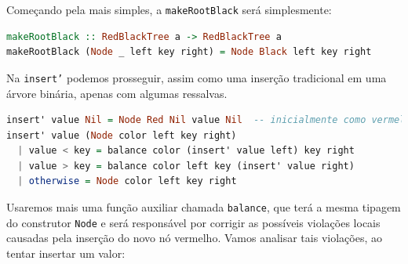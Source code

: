 Começando pela mais simples, a \texttt{makeRootBlack} será simplesmente:

\begin{lstlisting}[language=haskell]
makeRootBlack :: RedBlackTree a -> RedBlackTree a
makeRootBlack (Node _ left key right) = Node Black left key right
\end{lstlisting}
\FloatBarrier

Na \texttt{insert'} podemos prosseguir, assim como uma inserção tradicional em uma árvore binária, apenas com algumas ressalvas.

\begin{lstlisting}[language=haskell]
insert' value Nil = Node Red Nil value Nil  -- inicialmente como vermelho
insert' value (Node color left key right)                      
  | value < key = balance color (insert' value left) key right  
  | value > key = balance color left key (insert' value right) 
  | otherwise = Node color left key right                      
\end{lstlisting}
\FloatBarrier

Usaremos mais uma função auxiliar chamada \texttt{balance}, que terá a mesma tipagem do construtor \texttt{Node} e será responsável por corrigir as possíveis violações locais causadas pela inserção do novo nó vermelho. Vamos analisar tais violações, ao tentar insertar um valor:

